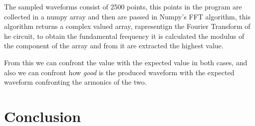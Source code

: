 \documentclass[a4paper, twocolumn]{article}
\begin{document}
The sampled waveforms consist of 2500 points, this points in the program are collected in a numpy array and then are passed in Numpy's FFT algorithm, this algorithm returns a complex valued array, rapresentign the Fourier Transform of he circuit, to obtain the fundamental frequency it is calculated the modulus of the component of the array and from it are extracted the highest value.

From this we can confront the value with the expected value in both cases, and also we can confront how \emph{good} is the produced waveform with the expected waveform confronting the armonics of the two.

\section{Conclusion}
\end{document}
